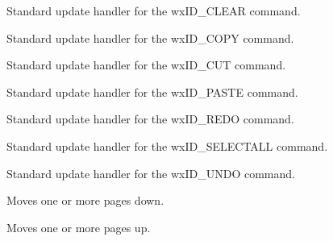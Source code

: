 Standard update handler for the wxID\_CLEAR command.

\label{wxrichtextctrlonupdatecopy}


Standard update handler for the wxID\_COPY command.

\label{wxrichtextctrlonupdatecut}


Standard update handler for the wxID\_CUT command.

\label{wxrichtextctrlonupdatepaste}


Standard update handler for the wxID\_PASTE command.

\label{wxrichtextctrlonupdateredo}


Standard update handler for the wxID\_REDO command.

\label{wxrichtextctrlonupdateselectall}


Standard update handler for the wxID\_SELECTALL command.

\label{wxrichtextctrlonupdateundo}


Standard update handler for the wxID\_UNDO command.

\label{wxrichtextctrlpagedown}


Moves one or more pages down.

\label{wxrichtextctrlpageup}


Moves one or more pages up.

\label{wxrichtextctrlpaintbackground}

